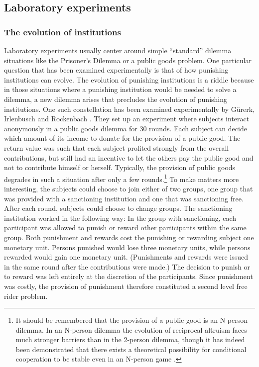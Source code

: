 \subsection{Laboratory experiments}
\label{laboratoryExperiments}

\subsubsection{The evolution of institutions}
\label{economicsInstitutions}

Laboratory experiments usually center around simple ``standard'' dilemma
situations like the Prisoner's Dilemma or a public goods problem. One
particular question that has been examined experimentally is that of how
punishing institutions can evolve. The evolution of punishing institutions is a
riddle because in those situations where a punishing institution would be
needed to solve a dilemma, a new dilemma arises that precludes the evolution
of punishing institutions. One such constellation has been examined
experimentally by Gürerk, Irlenbusch and Rockenbach
\cite[]{guererk-irlenbusch-rockenbach:2006}. They set up an experiment where
subjects interact anonymously in a public goods dilemma for 30 rounds. Each
subject can decide which amount of its income to donate for the provision of a
public good. The return value was such that each subject profited strongly
from the overall contributions, but still had an incentive to let the others
pay the public good and not to contribute himself or herself.  Typically, the
provision of public goods degrades in such a situation after only a few
rounds.\footnote{It should be remembered that the provision of a public good
  is an N-person dilemma. In an N-person dilemma the evolution of reciprocal
altruism faces much stronger barriers than in the 2-person dilemma, though it
has indeed been demonstrated that there exists a theoretical possibility for
conditional cooperation to be stable even in an N-person
game \cite[p.\ 82ff.]{taylor:1987}.}
To make matters more interesting, the subjects could choose to join either of
two groups, one group that was provided with a sanctioning institution and one
that was sanctioning free. After each round, subjects could choose to change
groups. The sanctioning institution worked in the following way: In the group
with sanctioning, each participant was allowed to punish or reward other
participants within the same group. Both punishment and rewards cost the
punishing or rewarding subject one monetary unit. Persons punished would lose
three monetary units, while persons rewarded would gain one monetary unit.
(Punishments and rewards were issued in the same round after the contributions
were made.) The decision to punish or to reward was left entirely at the
discretion of the participants. Since punishment was costly, the provision of
punishment therefore constituted a second level free rider problem.

